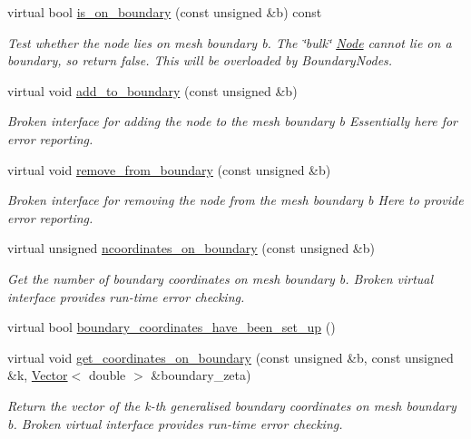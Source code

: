 \begin{DoxyCompactItemize}
virtual bool \hyperlink{classoomph_1_1Node_ad1341e137f63f0c4df88844957665cc9}{is\+\_\+on\+\_\+boundary} (const unsigned \&b) const
\begin{DoxyCompactList}\small\item\em Test whether the node lies on mesh boundary b. The \char`\"{}bulk\char`\"{} \hyperlink{classoomph_1_1Node}{Node} cannot lie on a boundary, so return false. This will be overloaded by Boundary\+Nodes. \end{DoxyCompactList}\item 
virtual void \hyperlink{classoomph_1_1Node_a915ee24c67747f5e377014b024b9083f}{add\+\_\+to\+\_\+boundary} (const unsigned \&b)
\begin{DoxyCompactList}\small\item\em Broken interface for adding the node to the mesh boundary b Essentially here for error reporting. \end{DoxyCompactList}\item 
virtual void \hyperlink{classoomph_1_1Node_a68d4703f8c8aa9f504ec2111dc1908f4}{remove\+\_\+from\+\_\+boundary} (const unsigned \&b)
\begin{DoxyCompactList}\small\item\em Broken interface for removing the node from the mesh boundary b Here to provide error reporting. \end{DoxyCompactList}\item 
virtual unsigned \hyperlink{classoomph_1_1Node_a245b0e182ca0877bda9bbcb978807273}{ncoordinates\+\_\+on\+\_\+boundary} (const unsigned \&b)
\begin{DoxyCompactList}\small\item\em Get the number of boundary coordinates on mesh boundary b. Broken virtual interface provides run-\/time error checking. \end{DoxyCompactList}\item 
virtual bool \hyperlink{classoomph_1_1Node_aa7f4a0c93bc405bb7ac9577c38bf0437}{boundary\+\_\+coordinates\+\_\+have\+\_\+been\+\_\+set\+\_\+up} ()
\item 
virtual void \hyperlink{classoomph_1_1Node_abc8b7dc78cc1d0aab34eeaf856e21ea8}{get\+\_\+coordinates\+\_\+on\+\_\+boundary} (const unsigned \&b, const unsigned \&k, \hyperlink{classoomph_1_1Vector}{Vector}$<$ double $>$ \&boundary\+\_\+zeta)
\begin{DoxyCompactList}\small\item\em Return the vector of the k-\/th generalised boundary coordinates on mesh boundary b. Broken virtual interface provides run-\/time error checking. \end{DoxyCompactList}\item 

\end{DoxyCompactItemize}
